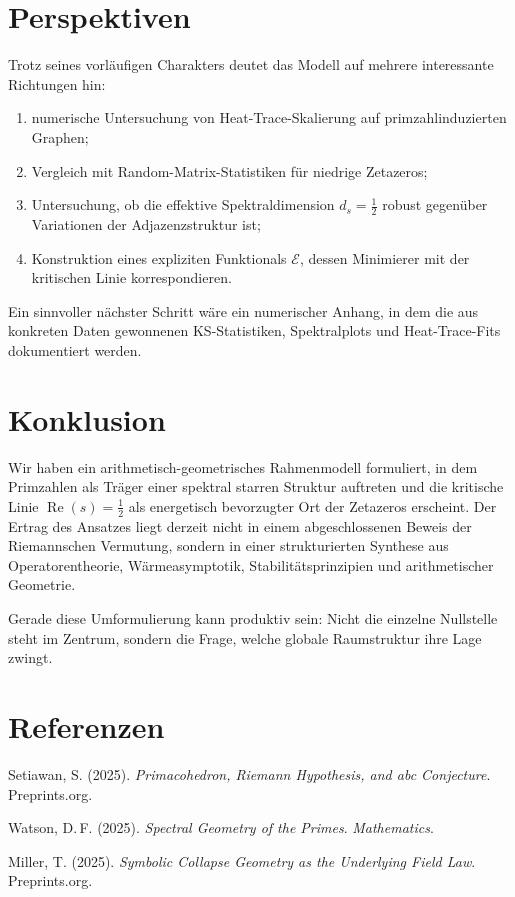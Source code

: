 \documentclass[11pt,a4paper]{article}
\theoremstyle{plain}
\theoremstyle{definition}
\theoremstyle{remark}
\newcommand{\RePart}{\operatorname{Re}}
\begin{document}
	\section{Perspektiven}
	
	Trotz seines vorläufigen Charakters deutet das Modell auf mehrere interessante Richtungen hin:
	\begin{enumerate}[label=\arabic*.]
		\item numerische Untersuchung von Heat-Trace-Skalierung auf primzahlinduzierten Graphen;
		\item Vergleich mit Random-Matrix-Statistiken für niedrige Zetazeros;
		\item Untersuchung, ob die effektive Spektraldimension $d_s=\tfrac12$ robust gegenüber Variationen der Adjazenzstruktur ist;
		\item Konstruktion eines expliziten Funktionals $\mathcal{E}$, dessen Minimierer mit der kritischen Linie korrespondieren.
	\end{enumerate}
	
	Ein sinnvoller nächster Schritt wäre ein numerischer Anhang, in dem die aus konkreten Daten gewonnenen KS-Statistiken, Spektralplots und Heat-Trace-Fits dokumentiert werden.
	
	\section{Konklusion}
	
	Wir haben ein arithmetisch-geometrisches Rahmenmodell formuliert, in dem Primzahlen als Träger einer spektral starren Struktur auftreten und die kritische Linie $\RePart(s)=\tfrac12$ als energetisch bevorzugter Ort der Zetazeros erscheint. Der Ertrag des Ansatzes liegt derzeit nicht in einem abgeschlossenen Beweis der Riemannschen Vermutung, sondern in einer strukturierten Synthese aus Operatorentheorie, Wärmeasymptotik, Stabilitätsprinzipien und arithmetischer Geometrie.
	
	Gerade diese Umformulierung kann produktiv sein: Nicht die einzelne Nullstelle steht im Zentrum, sondern die Frage, welche globale Raumstruktur ihre Lage zwingt.
	
	\section*{Referenzen}
	
	\begin{enumerate}[label={[}\arabic*{]}]
		\item Setiawan, S. (2025). \textit{Primacohedron, Riemann Hypothesis, and abc Conjecture}. Preprints.org.
		\item Watson, D.\,F. (2025). \textit{Spectral Geometry of the Primes}. \textit{Mathematics}.
		\item Miller, T. (2025). \textit{Symbolic Collapse Geometry as the Underlying Field Law}. Preprints.org.
	\end{enumerate}
	
\end{document}

